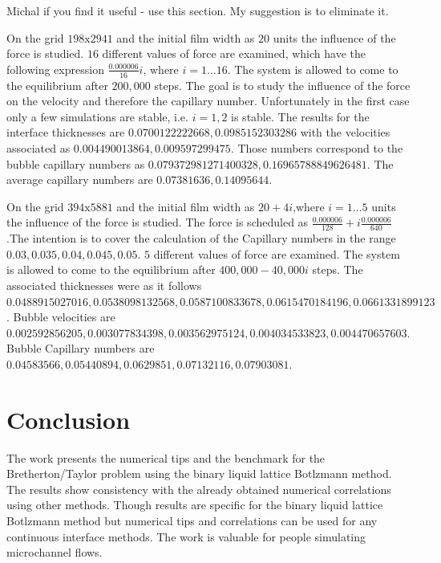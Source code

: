 \documentclass{article}
\begin{document}
{\color{red} Michal if you find it useful - use this section. My suggestion is
to eliminate it.}
\begin{description}
 \item 
On the grid $198\mathrm{x}2941$ and the initial film width as $20$ units
the
influence of the force is studied. $16$ different values of force are examined,
which have the following expression $\frac{0.000006}{16} i$, where $i=1 \dots
16$. The system is allowed to come to the equilibrium after $200,000$ steps. The
goal is to study the influence of the force on the velocity and therefore the
capillary number. Unfortunately in the first case only a few simulations are
stable, i.e.
$i=1,2$ is stable. The results for the interface thicknesses are
$0.0700122222668,0.0985152303286$ with the velocities associated as
$0.004490013864,0.009597299475$. Those numbers correspond to the bubble
capillary numbers as $0.079372981271400328, 0.16965788849626481$. The average
capillary numbers are $0.07381636,0.14095644$. 

\item
On the grid $394\mathrm{x}5881$ and the initial film width as $20+4 i$,where
$i=1 \dots 5$ units the
influence of the force is studied. The force is scheduled as
$\frac{0.000006}{128}+i \frac{0.000006}{640}$.The intention is to cover the
calculation of the Capillary numbers in the range $0.03,0.035,0.04,0.045,0.05$. 
$5$ different values of force are examined. The system is allowed to come to the
equilibrium after $400,000-40,000 i$ steps. The associated thicknesses were as
it follows
$0.0488915027016,0.0538098132568,0.0587100833678,0.0615470184196,
0.0661331899123$. Bubble velocities are
$0.002592856205,0.003077834398,0.003562975124,0.004034533823,0.004470657603$.
Bubble Capillary numbers are $0.04583566,  0.05440894,  0.0629851 , 
0.07132116, 0.07903081$.
\end{description}

\section{Conclusion}
The work presents the numerical tips and the benchmark for the
Bretherton/Taylor problem using the binary liquid lattice Botlzmann method. The
results show consistency with the already obtained numerical correlations using
other methods. Though results are specific for the binary liquid lattice
Botlzmann method but numerical tips and correlations can be used for any
continuous interface methods. The work is valuable for people simulating
microchannel flows.



\end{document}
